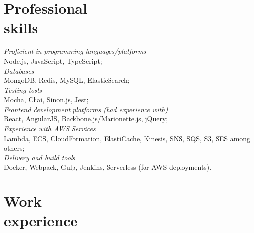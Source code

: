 \documentclass[margin, 10pt]{res} %
\begin{document}
\begin{resume}
\vspace*{-0.5cm}
\section{Professional\\ skills}
{\sl  Proficient in programming languages/platforms}  \\
\-\hspace{0.5cm} Node.js, JavaScript, TypeScript;\\
{\sl Databases }\\
\-\hspace{0.5cm} MongoDB, Redis, MySQL, ElasticSearch; \\
{\sl Testing tools }\\
\-\hspace{0.5cm} Mocha, Chai, Sinon.js, Jest; \\
{\sl Frontend development platforms (had experience with) }\\
\-\hspace{0.5cm} React, AngularJS,  Backbone.js/Marionette.js, jQuery;\\
{\sl Experience with AWS Services } \\
\-\hspace{0.5cm}  Lambda, ECS, CloudFormation, ElastiCache, Kinesis, SNS, SQS, S3, SES among others; \\
{\sl Delivery and build tools } \\
\-\hspace{0.5cm} Docker, Webpack, Gulp, Jenkins, Serverless (for AWS deployments).

\section{Work\\ experience}


\end{resume}
\end{document}
